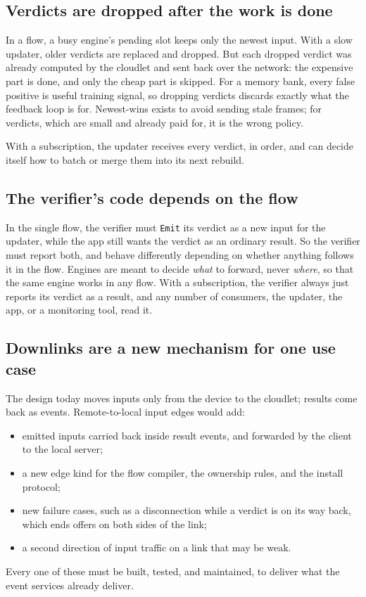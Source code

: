 \documentclass[11pt]{article}
\newcommand{\code}[1]{\texttt{#1}}
\begin{document}
\subsection{Verdicts are dropped after the work is done}

In a flow, a busy engine's pending slot keeps only the newest input. With a
slow updater, older verdicts are replaced and dropped. But each dropped verdict
was already computed by the cloudlet and sent back over the network: the
expensive part is done, and only the cheap part is skipped. For a memory bank,
every false positive is useful training signal, so dropping verdicts discards
exactly what the feedback loop is for. Newest-wins exists to avoid sending
stale frames; for verdicts, which are small and already paid for, it is the
wrong policy.

With a subscription, the updater receives every verdict, in order, and can
decide itself how to batch or merge them into its next rebuild.

\subsection{The verifier's code depends on the flow}

In the single flow, the verifier must \code{Emit} its verdict as a new input
for the updater, while the app still wants the verdict as an ordinary result.
So the verifier must report both, and behave differently depending on whether
anything follows it in the flow. Engines are meant to decide \emph{what} to
forward, never \emph{where}, so that the same engine works in any flow. With a
subscription, the verifier always just reports its verdict as a result, and
any number of consumers, the updater, the app, or a monitoring tool, read it.

\subsection{Downlinks are a new mechanism for one use case}

The design today moves inputs only from the device to the cloudlet; results
come back as events. Remote-to-local input edges would add:
\begin{itemize}[nosep]
  \item emitted inputs carried back inside result events, and forwarded by the
        client to the local server;
  \item a new edge kind for the flow compiler, the ownership rules, and the
        install protocol;
  \item new failure cases, such as a disconnection while a verdict is on its
        way back, which ends offers on both sides of the link;
  \item a second direction of input traffic on a link that may be weak.
\end{itemize}
Every one of these must be built, tested, and maintained, to deliver what the
event services already deliver.
\end{document}
